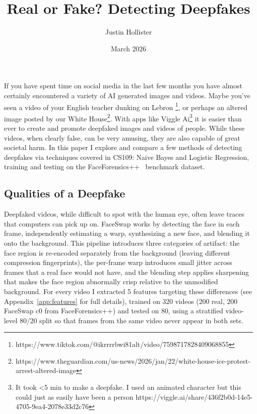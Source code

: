 \documentclass{article}
\title{Real or Fake? Detecting Deepfakes}
\author{Justin Hollister}
\date{March 2026}
\begin{document}
\maketitle
\vspace{-1em}

If you have spent time on social media in the last few months you have almost certainly encountered a variety of AI generated images and videos.  Maybe you've seen a video of your English teacher dunking on Lebron \footnote{https://www.tiktok.com/@ikrrrrbwi81alt/video/7598717828409068855}, or perhaps an altered image posted by our White House\footnote{https://www.theguardian.com/us-news/2026/jan/22/white-house-ice-protest-arrest-altered-image}. With apps like Viggle Ai\footnote{It took <5 min to make a deepfake. I used an animated character but this could just as easily have been a person https://viggle.ai/share/436f2b0d-14e5-4705-9ea4-2078e33d2c76 } it is easier than ever to create and promote deepfaked images and videos of people. While these videos, when clearly false, can be very amusing, they are also capable of great societal harm. In this paper I explore and compare a few methods of detecting deepfakes via techniques covered in CS109: Naive Bayes and Logistic Regression, training and testing on the FaceForensics++~\cite{rossler2019faceforensics} benchmark dataset.

\subsection*{Qualities of a Deepfake}
Deepfaked videos, while difficult to spot with the human eye, often leave traces that computers can pick up on. FaceSwap works by detecting the face in each frame, independently estimating a warp, synthesizing a new face, and blending it onto the background. This pipeline introduces three categories of artifact: the face region is re-encoded separately from the background (leaving different compression fingerprints), the per-frame warp introduces small jitter across frames that a real face would not have, and the blending step applies sharpening that makes the face region abnormally crisp relative to the unmodified background. For every video I extracted 5 features targeting these differences (see Appendix~\ref{app:features} for full details), trained on 320 videos (200 real, 200 FaceSwap c0 from FaceForensics++\cite{rossler2019faceforensics}) and tested on 80, using a stratified video-level 80/20 split so that frames from the same video never appear in both sets.
\end{document}
